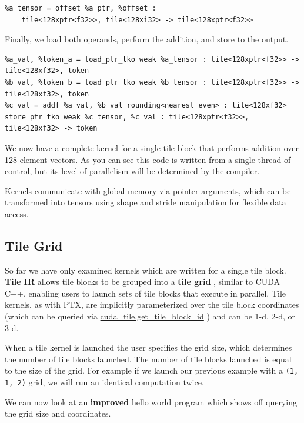\documentclass{article}
\begin{document}
\begin{lstlisting}
%a_tensor = offset %a_ptr, %offset :
    tile<128xptr<f32>>, tile<128xi32> -> tile<128xptr<f32>>
\end{lstlisting}

Finally, we load both operands, perform the addition, and store to the output.


\begin{lstlisting}
%a_val, %token_a = load_ptr_tko weak %a_tensor : tile<128xptr<f32>> -> tile<128xf32>, token
%b_val, %token_b = load_ptr_tko weak %b_tensor : tile<128xptr<f32>> -> tile<128xf32>, token
%c_val = addf %a_val, %b_val rounding<nearest_even> : tile<128xf32>
store_ptr_tko weak %c_tensor, %c_val : tile<128xptr<f32>>, tile<128xf32> -> token
\end{lstlisting}

We now have a complete kernel for a single tile-block that performs addition over 128 element vectors. As you can see this code is written from a single thread of control, but its level of parallelism will be determined by the compiler.


Kernels communicate with global memory via pointer arguments, which can be transformed into tensors using shape and stride manipulation for flexible data access.



\subsection{Tile Grid}

So far we have only examined kernels which are written for a single tile block. \textbf{Tile IR} allows tile blocks to be grouped into a \textbf{tile grid} , similar to CUDA C++, enabling users to launch sets of tile blocks that execute in parallel. Tile kernels, as with PTX, are implicitly parameterized over the tile block coordinates (which can be queried via \href{https://docs.nvidia.com/cuda/tile-ir/latest/sections/operations.html#op-cuda-tile-get-tile-block-id}{cuda\_tile.get\_tile\_block\_id} ) and can be 1-d, 2-d, or 3-d.


When a tile kernel is launched the user specifies the grid size, which determines the number of tile blocks launched. The number of tile blocks launched is equal to the size of the grid. For example if we launch our previous example with a \texttt{(1, 1, 2)} grid, we will run an identical computation twice.


We can now look at an \textbf{improved} hello world program which shows off querying the grid size and coordinates.
\end{document}
